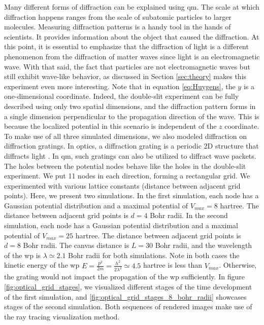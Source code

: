 Many different forms of diffraction can be explained using \acrshort{qm}.
The scale at which diffraction happens ranges from the scale of subatomic particles to larger molecules.
Measuring diffraction patterns is a handy tool in the hands of scientists.
It provides information about the object that caused the diffraction.
At this point, it is essential to emphasize that the diffraction of light is a different phenomenon from the diffraction of matter waves since light is an electromagnetic wave.
With that said, the fact that particles are not electromagnetic waves but still exhibit wave-like behavior, as discussed in Section \ref{sec:theory} makes this experiment even more interesting.
Note that in equation \ref{eq:Huygens}, the $y$ is a one-dimensional coordinate. Indeed, the double-slit experiment can be fully described using only two spatial dimensions, and the diffraction pattern forms in a single dimension perpendicular to the propagation direction of the wave.
This is because the localized potential in this scenario is independent of the $z$ coordinate.
To make use of all three simulated dimensions, we also modeled diffraction on diffraction gratings.
In optics, a diffraction grating is a periodic 2D structure that diffracts light \cite{Stroke1967}.
In \acrshort{qm}, such gratings can also be utilized to diffract wave packets.
The holes between the potential nodes behave like the holes in the double-slit experiment.
We put 11 nodes in each direction, forming a rectangular grid.
We experimented with various lattice constants (distance between adjacent grid points).
Here, we present two simulations.
In the first simulation, each node has a Gaussian potential distribution and a maximal potential of $V_{max} = 8$ hartree.
The distance between adjacent grid points is $d = 4$ Bohr radii.
In the second simulation, each node has a Gaussian potential distribution and a maximal potential of $V_{max} = 25$ hartree.
The distance between adjacent grid points is $d = 8$ Bohr radii.
The canvas distance is $L=30$ Bohr radii, and the wavelength of the \acrshort{wp} is $\lambda\simeq 2.1$ Bohr radii for both simulations.
Note in both cases the kinetic energy of the \acrshort{wp} $E = \frac{p^2}{2m} = \frac{h^2}{2\lambda^2} \simeq 4.5$ hartree is less than $V_{max}$.
Otherwise, the grating would not impact the propagation of the \acrshort{wp} sufficiently.
In figure \ref{fig:optical_grid_stages}, we visualized different stages of the time development of the first simulation, and \ref{fig:optical_grid_stages_8_bohr_radii} showcases stages of the second simulation.
Both sequences of rendered images make use of the ray tracing visualization method.
